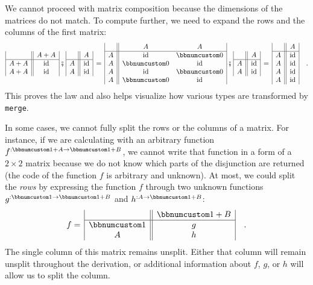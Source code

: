 We cannot proceed with matrix composition because the dimensions of
the matrices do not match. To compute further, we need to expand the
rows and the columns of the first matrix:
\[
\begin{array}{|c||c|}
 & A+A\\
\hline A+A & \text{id}\\
A+A & \text{id}
\end{array}\,\bef\,\begin{array}{|c||c|}
 & A\\
\hline A & \text{id}\\
A & \text{id}
\end{array}\,=\,\begin{array}{|c||cc|}
 & A & A\\
\hline A & \text{id} & \bbnum 0\\
A & \bbnum 0 & \text{id}\\
A & \text{id} & \bbnum 0\\
A & \bbnum 0 & \text{id}
\end{array}\,\bef\,\begin{array}{|c||c|}
 & A\\
\hline A & \text{id}\\
A & \text{id}
\end{array}\,=\,\begin{array}{|c||c|}
 & A\\
\hline A & \text{id}\\
A & \text{id}\\
A & \text{id}\\
A & \text{id}
\end{array}\quad.
\]
This proves the law and also helps visualize how various types are
transformed by \lstinline!merge!.

In some cases, we cannot fully split the rows or the columns of a
matrix. For instance, if we are calculating with an arbitrary function
$f^{:\bbnum 1+A\rightarrow\bbnum 1+B}$, we cannot write that function
in a form of a $2\times2$ matrix because we do not know which parts
of the disjunction are returned (the code of the function $f$ is
arbitrary and unknown). At most, we could split the \emph{rows} by
expressing the function $f$ through two unknown functions $g^{:\bbnum 1\rightarrow\bbnum 1+B}$
and $h^{:A\rightarrow\bbnum 1+B}$:
\[
f=\,\begin{array}{|c||c|}
 & \bbnum 1+B\\
\hline \bbnum 1 & g\\
A & h
\end{array}\quad.
\]
The single column of this matrix remains unsplit. Either that column
will remain unsplit throughout the derivation, or additional information
about $f$, $g$, or $h$ will allow us to split the column.

